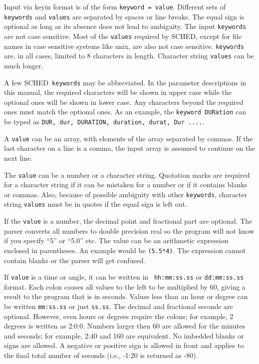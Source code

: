 \documentclass{report}
\newcommand{\sched}{{\sc SCHED}}
\newcommand{\schedb}{{\sc SCHED~}}
\begin{document}
Input via keyin format is of the form {\tt keyword = value}. Different
sets of {\tt keywords} and {\tt values} are separated by spaces or line
breaks. The equal sign is optional as long as its absence does not
lead to ambiguity.  The input {\tt keywords} are not case sensitive.
Most of the {\tt values} required by \sched, except for file
names in case sensitive systems like unix, are also not case
sensitive.  {\tt keywords} are, in all cases, limited to 8 characters
in length.  Character string {\tt values} can be much longer.

A few \schedb {\tt keywords} may be abbreviated.  In the parameter
descriptions in this manual, the required characters will be shown in
upper case while the optional ones will be shown in lower case.  Any
characters beyond the required ones must match the optional ones.  As
an example, the {\tt keyword DURation} can be typed as {\tt DUR, dur,
DURATION, duration, durat, Dur ....}.

A {\tt value} can be an array, with elements of the array separated by
commas. If the last character on a line is a comma, the input array is
assumed to continue on the next line.

The {\tt value} can be a number or a character string.  Quotation
marks are required for a character string if it can be mistaken for a
number or if it contains blanks or commas.  Also, because of possible
ambiguity with other {\tt keywords}, character string {\tt values}
must be in quotes if the equal sign is left out.

If the {\tt value} is a number, the decimal point and fractional part are
optional.  The parser converts all numbers to double precision real so
the program will not know if you specify ``5'' or ``5.0'' etc.  The
value can be an arithmetic expression enclosed in parentheses.  An
example would be {\tt (5.5*4)}.  The expression cannot contain
blanks or the parser will get confused.

If {\tt value} is a time or angle, it can be written in {\tt
hh:mm:ss.ss} or {\tt dd:mm:ss.ss} format. Each colon causes all values
to the left to be multiplied by 60, giving a result to the program
that is in seconds. Values less than an hour or degree can be written
{\tt mm:ss.ss} or just {\tt ss.ss}. The decimal and fractional seconds
are optional.  However, even hours or degrees require the colons; for
example, 2 degrees is written as 2:0:0. Numbers larger then 60 are
allowed for the minutes and seconds; for example, 2:40 and 160 are
equivalent.  No imbedded blanks or signs are allowed.  A negative
or positive sign is allowed in front and applies to the final total
number of seconds (i.e., -1:20 is returned as -80).
\end{document}
